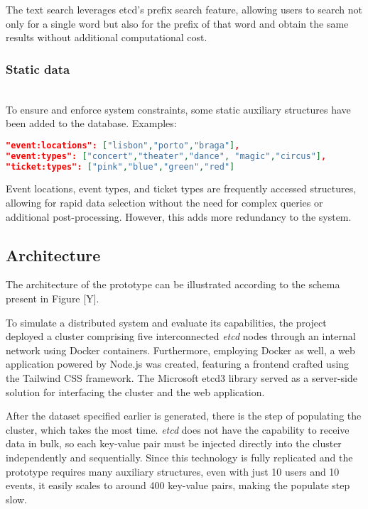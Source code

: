 \documentclass[screen,review]{acmart}
\begin{document}
The text search leverages etcd's prefix search feature, allowing users to search not only for a single word but also for the prefix of that word and obtain the same results without additional computational cost.\\

\subsubsection{Static data}~\\
To ensure and enforce system constraints, some static auxiliary structures have been added to the database. Examples:

\begin{lstlisting}[language=json]
"event:locations": ["lisbon","porto","braga"],
"event:types": ["concert","theater","dance", "magic","circus"],
"ticket:types": ["pink","blue","green","red"]
\end{lstlisting}

Event locations, event types, and ticket types are frequently accessed structures, allowing for rapid data selection without the need for complex queries or additional post-processing. However, this adds more redundancy to the system.

\subsection{Architecture}

The architecture of the prototype can be illustrated according to the schema present in Figure [Y].

To simulate a distributed system and evaluate its capabilities, the project deployed a cluster comprising five interconnected \textit{etcd} nodes through an internal network using Docker containers. Furthermore, employing Docker as well, a web application powered by Node.js was created, featuring a frontend crafted using the Tailwind CSS framework. The Microsoft etcd3 library served as a server-side solution for interfacing the cluster and the web application.

After the dataset specified earlier is generated, there is the step of populating the cluster, which takes the most time. \textit{etcd} does not have the capability to receive data in bulk, so each key-value pair must be injected directly into the cluster independently and sequentially. Since this technology is fully replicated and the prototype requires many auxiliary structures, even with just 10 users and 10 events, it easily scales to around 400 key-value pairs, making the populate step slow.
\end{document}
